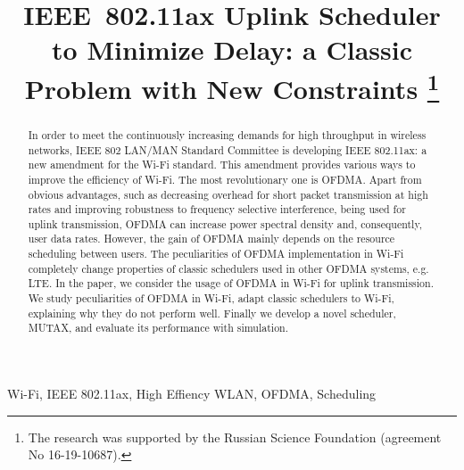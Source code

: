 
%


\IEEEoverridecommandlockouts

\title{%
IEEE~802.11ax Uplink Scheduler to Minimize Delay: a Classic Problem with New Constraints	
\thanks{The research was supported by the Russian Science Foundation (agreement No 16-19-10687).}}

\author{
}

\maketitle

\begin{abstract}
In order to meet the continuously increasing demands for high throughput in wireless networks, IEEE 802 LAN/MAN Standard Committee is developing IEEE 802.11ax: a new amendment for the Wi-Fi standard.
This amendment provides various ways to improve the efficiency of Wi-Fi. The most revolutionary one is OFDMA.
Apart from obvious advantages, such as decreasing overhead for short packet transmission at high rates and improving robustness to frequency selective interference, being used for uplink transmission, OFDMA can increase power spectral density and, consequently, user data rates. However, the gain of OFDMA mainly depends on the resource scheduling between users.
The peculiarities of OFDMA implementation in Wi-Fi completely change properties of classic schedulers used in other OFDMA systems, e.g. LTE. 
In the paper, we consider the usage of OFDMA in Wi-Fi for uplink transmission.
We study peculiarities of OFDMA in Wi-Fi, adapt classic schedulers to Wi-Fi, explaining why they do not perform well.
Finally we develop a novel scheduler, MUTAX, and evaluate its performance with simulation. 
\end{abstract}

\begin{IEEEkeywords}
Wi-Fi, IEEE 802.11ax, High Effiency WLAN, OFDMA, Scheduling
\end{IEEEkeywords}

